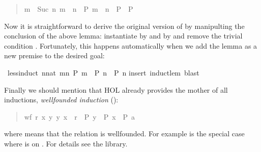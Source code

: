 \begin{isabellebody}
\begin{isamarkuptext}
\begin{quote}
\begin{isabelle}%
{\isasymlbrakk}\mbox{m}\ {\isacharless}\ Suc\ \mbox{n}{\isacharsemicolon}\ \mbox{m}\ {\isacharless}\ \mbox{n}\ {\isasymLongrightarrow}\ \mbox{P}{\isacharsemicolon}\ \mbox{m}\ {\isacharequal}\ \mbox{n}\ {\isasymLongrightarrow}\ \mbox{P}{\isasymrbrakk}\ {\isasymLongrightarrow}\ \mbox{P}
\end{isabelle}%

\end{quote}

Now it is straightforward to derive the original version of
 by manipulting the conclusion of the above lemma:
instantiate  by  and  by  and
remove the trivial condition . Fortunately, this
happens automatically when we add the lemma as a new premise to the
desired goal:%
\end{isamarkuptext}%
\ less{\isacharunderscore}induct{\isacharcolon}\ {\isachardoublequote}{\isacharparenleft}{\isasymAnd}n{\isacharcolon}{\isacharcolon}nat{\isachardot}\ {\isasymforall}m{\isacharless}n{\isachardot}\ P\ m\ {\isasymLongrightarrow}\ P\ n{\isacharparenright}\ {\isacharequal}{\isacharequal}{\isachargreater}\ P\ n{\isachardoublequote}\isanewline
{}insert\ induct{\isacharunderscore}lem{\isacharcomma}\ blast{\isacharparenright}%
\begin{isamarkuptext}%
\noindent
Finally we should mention that HOL already provides the mother of all
inductions, \emph{wellfounded induction} ():
\begin{quote}

\begin{isabelle}%
{\isasymlbrakk}wf\ \mbox{r}{\isacharsemicolon}\ {\isasymAnd}\mbox{x}{\isachardot}\ {\isasymforall}\mbox{y}{\isachardot}\ {\isacharparenleft}\mbox{y}{\isacharcomma}\ \mbox{x}{\isacharparenright}\ {\isasymin}\ \mbox{r}\ {\isasymlongrightarrow}\ \mbox{P}\ \mbox{y}\ {\isasymLongrightarrow}\ \mbox{P}\ \mbox{x}{\isasymrbrakk}\ {\isasymLongrightarrow}\ \mbox{P}\ \mbox{a}
\end{isabelle}%

\end{quote}
where  means that the relation  is wellfounded.
For example  is the special case where  is \isa{<} on .
For details see the library.%
\end{isamarkuptext}%
\end{isabellebody}%

